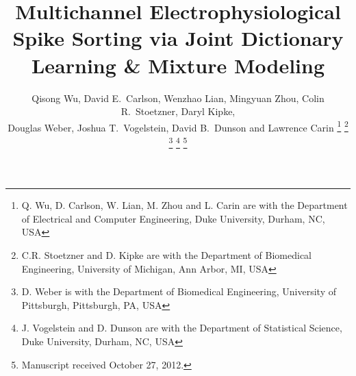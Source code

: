 \documentclass[journal]{IEEEtran}
\begin{document}

%
\title{
{Multichannel Electrophysiological Spike Sorting via Joint Dictionary Learning \& Mixture Modeling}
}%
%



%

\author{Qisong Wu, David E.~Carlson, Wenzhao Lian, Mingyuan Zhou, Colin R.~Stoetzner, Daryl Kipke, \\ Douglas Weber, Joshua T.~Vogelstein, David B.~Dunson and Lawrence Carin%
\thanks{Q. Wu, D. Carlson, W. Lian, M. Zhou and L. Carin are with the Department
of Electrical and Computer Engineering, Duke University, Durham, NC, USA}%
\thanks{C.R. Stoetzner and D. Kipke are with the Department of Biomedical Engineering, University of Michigan, Ann Arbor, MI, USA}%
\thanks{D. Weber is with the Department of Biomedical Engineering, University of Pittsburgh, Pittsburgh, PA, USA}%
\thanks{J. Vogelstein and D. Dunson are with the Department of Statistical Science, Duke University, Durham, NC, USA}
\thanks{Manuscript received October 27, 2012.}}

%
%
\end{document}

